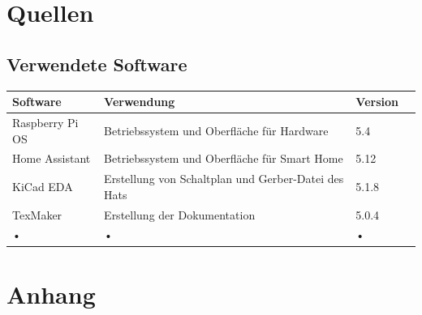 \documentclass[12pt,a4paper]{article}
\begin{document}
 	\section{Quellen}
 	\subsection{Verwendete Software}
 	\begin{tabular}{|l|l|l|c|}
 	\hline 
 	\textbf{Software} & \textbf{Verwendung} & \textbf{Version} \\ 
 	\hline 
 	Raspberry Pi OS & Betriebssystem und Oberfläche für Hardware & 5.4 \\ 
 	\hline 
 	Home Assistant & Betriebssystem und Oberfläche für Smart Home & 5.12 \\ 
 	\hline 
 	KiCad EDA & Erstellung von Schaltplan und Gerber-Datei des Hats & 5.1.8 \\ 
 	\hline 
 	TexMaker & Erstellung der Dokumentation & 5.0.4 \\ 
 	\hline 
 	• & • & • \\ 
 	\hline 
 	\end{tabular} 
 	\newpage
 	\section{Anhang}
\end{document}
